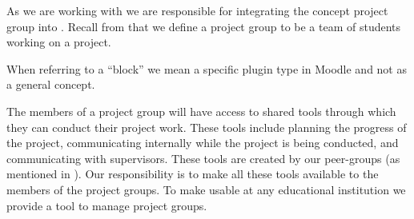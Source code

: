 As we are working with \administrationgroup{} we are responsible for integrating the concept project group into \moodle{}. 
Recall from  that we define a project group to be a team of students working on a project.



When referring to a ``block'' we mean a specific plugin type in Moodle and not as a general concept.

The members of a project group will have access to shared tools through which they can conduct their project work.
These tools include planning the progress of the project, communicating internally while the project is being conducted, and communicating with supervisors.
These tools are created by our peer-groups (as mentioned in ).
Our responsibility is to make all these tools available to the members of the project groups.
To make \system{} usable at any educational institution we provide a tool to manage project groups.



